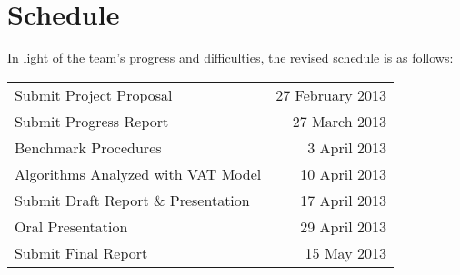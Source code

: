 \section{Schedule}
  In light of the team's progress and difficulties, the revised schedule is as
  follows:
  \begin{tabular}{lr}
    Submit Project Proposal             & 27 February 2013\\
    Submit Progress Report              & 27 March 2013   \\
    Benchmark Procedures                &  3 April 2013   \\
    Algorithms Analyzed with VAT Model  & 10 April 2013   \\
    Submit Draft Report \& Presentation & 17 April 2013   \\
    Oral Presentation                   & 29 April 2013   \\
    Submit Final Report                 & 15 May 2013     \\
  \end{tabular}
  